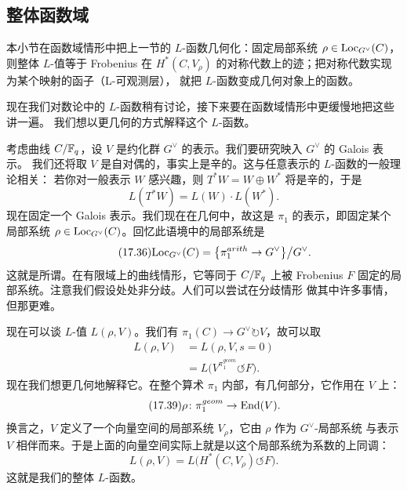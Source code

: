 \subsection{整体函数域}

\begin{sectionkey}
本小节在函数域情形中把上一节的 $L$-函数几何化：固定局部系统
$\rho\in\mathrm{Loc}_{G^{\vee}}(C)$，则整体 $L$-值等于 Frobenius 在
$H^*(C,V_{\rho})$ 的对称代数上的迹；把对称代数实现为某个映射的函子（L-可观测层），
就把 $L$-函数变成几何对象上的函数。
\end{sectionkey}

现在我们对数论中的 $L$-函数稍有讨论，接下来要在函数域情形中更缓慢地把这些讲一遍。
我们想以更几何的方式解释这个 $L$-函数。

考虑曲线 $C/\mathbb{F}_q$，设 $V$ 是约化群 $G^{\vee}$ 的表示。我们要研究映入 $G^{\vee}$ 的 Galois 表示。
我们还将取 $V$ 是自对偶的，事实上是辛的。这与任意表示的 $L$-函数的一般理论相关：
若你对一般表示 $W$ 感兴趣，则 $T^*W=W\oplus W^*$ 将是辛的，于是
\begin{equation}\tag{17.35}\label{eq:17.35}
L(T^*W)=L(W)\cdot L(W^*).
\end{equation}
现在固定一个 Galois 表示。我们现在在几何中，故这是 $\pi_1$ 的表示，即固定某个局部系统
$\rho\in\mathrm{Loc}_{G^{\vee}}(C)$。回忆此语境中的局部系统是
\begin{equation}\tag{17.36}\label{eq:17.36}
\mathrm{Loc}_{G^{\vee}}(C)=\bigl\{\pi_1^{arith}\to G^{\vee}\bigr\}\big/G^{\vee}.
\end{equation}
这就是所谓。在有限域上的曲线情形，它等同于
$C/\mathbb{F}_q$ 上被 Frobenius $F$ 固定的局部系统。注意我们假设处处非分歧。人们可以尝试在分歧情形
做其中许多事情，但那更难。

现在可以谈 $L$-值 $L(\rho,V)$。我们有 $\pi_1(C)\to G^{\vee}\circlearrowright V$，故可以取
\begin{align}
L(\rho,V)&=L(\rho,V,s=0)\tag{17.37}\label{eq:17.37}\\
&=L\bigl(V^{\pi_1^{geom}}\circlearrowleft F\bigr).\tag{17.38}\label{eq:17.38}
\end{align}
现在我们想更几何地解释它。在整个算术 $\pi_1$ 内部，有几何部分，它作用在 $V$ 上：
\begin{equation}\tag{17.39}\label{eq:17.39}
\rho\colon\pi_1^{geom}\to\mathrm{End}(V).
\end{equation}
换言之，$V$ 定义了一个向量空间的局部系统 $V_{\rho}$，它由 $\rho$ 作为 $G^{\vee}$-局部系统
与表示 $V$ 相伴而来。于是上面的向量空间实际上就是以这个局部系统为系数的上同调：
\begin{equation}\tag{17.40}\label{eq:17.40}
L(\rho,V)=L\bigl(H^*(C,V_{\rho})\circlearrowleft F\bigr).
\end{equation}
这就是我们的整体 $L$-函数。

